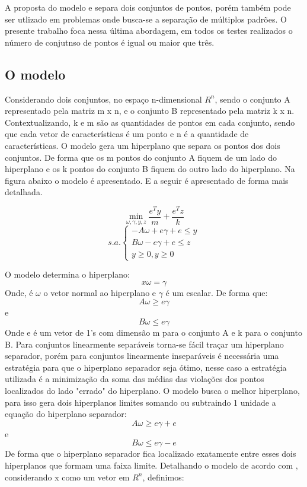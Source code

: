 A proposta do modelo e separa dois conjuntos de pontos, porém também pode ser utlizado em problemas onde busca-se a separação de múltiplos padrões. O presente trabalho foca nessa última abordagem, em todos os testes realizados o número de conjutnso de pontos é igual ou maior que três.

\subsection{O modelo}
Considerando dois conjuntos, no espaço n-dimensional $ R^{n} $, sendo o conjunto A representado pela matriz m x n, e o conjunto B representado pela matriz k x n. Contextualizando, k e m são as quantidades de pontos em cada conjunto, sendo que cada vetor de características é um ponto e n é a quantidade de características. O modelo gera um hiperplano que separa os pontos dos dois conjuntos. De forma que os m pontos do conjunto A fiquem de um lado do hiperplano e os k pontos do conjunto B fiquem do outro lado do hiperplano. Na figura abaixo o modelo é apresentado. E a seguir é apresentado de forma mais detalhada.

$$\min_{\omega ,\gamma ,y,z}\frac{e^{T}y}{m}+\frac{e^{T}z}{k}$$
$$s.a.\left\{\begin{matrix}-A\omega +e\gamma+e\leq y\\B\omega -e\gamma+e\leq  z\\ y\geq 0,y\geq 0\end{matrix}\right.$$

O modelo determina o hiperplano:
$$ x\omega = \gamma $$
Onde,  é $\omega$ o vetor normal ao hiperplano e $\gamma$ é um escalar. De forma que:
$$A\omega \geq e\gamma$$
e
$$B\omega \leq e\gamma$$
Onde e é um vetor de 1’s com dimensão m para o conjunto A e k para o conjunto B.
Para conjuntos linearmente separáveis torna-se fácil traçar um hiperplano separador, porém para conjuntos linearmente inseparáveis é necessária uma estratégia para que o hiperplano separador seja ótimo, nesse caso a estratégia utilizada é a minimização da soma das médias das violações dos pontos localizados do lado "errado" do hiperplano.
O modelo busca o melhor hiperplano, para isso gera dois hiperplanos limites somando ou subtraindo 1 unidade a equação do hiperplano separador:
$$A\omega \geq e\gamma + e$$
e
$$B\omega \leq e\gamma - e$$
De forma que o hiperplano separador fica localizado exatamente entre esses dois hiperplanos que formam uma faixa limite.
Detalhando o modelo de acordo com , considerando x como um vetor em $ R^{n} $, definimos:

